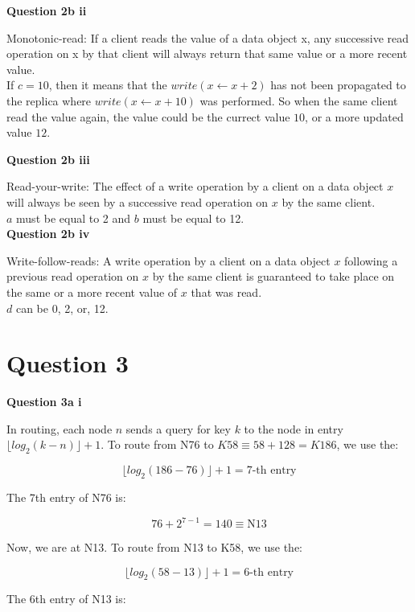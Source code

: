 \documentclass[11pt,a4paper]{report}
\begin{document}
\begin{multicols*}{2}
\noindent \textbf{Question 2b ii}

\noindent Monotonic-read: If a client reads the value of a data object x, any successive read operation on x by that client will always return that same value or a more recent value.\\

\noindent If $c=10$, then it means that the $write(x\leftarrow x + 2)$ has not been propagated to the replica where $write(x\leftarrow x + 10)$ was performed. So when the same client read the value again, the value could be the currect value $10$, or a more updated value $12$.

\noindent \textbf{Question 2b iii}

\noindent Read-your-write: The effect of a write operation by a client on a data object $x$ will always be seen by a successive read operation on $x$ by the same client.\\

\noindent $a$ must be equal to 2 and $b$ must be equal to 12.\\


\noindent \textbf{Question 2b iv}

\noindent Write-follow-reads: A write operation by a client on a data object $x$ following a previous read operation on $x$ by the same client is guaranteed to take place on the same or a more recent value of $x$ that was read.\\

\noindent $d$ can be 0, 2, or, 12.

\section{Question 3}

\noindent \textbf{Question 3a i}

\noindent In routing, each node $n$ sends a query for key $k$ to the node in entry $\lfloor log_2(k-n) \rfloor + 1$. To route from N76 to $K58 \equiv 58 + 128 = K186$, we use the:

$$\lfloor log_2(186-76) \rfloor + 1 = 7\text{-th entry}$$

\noindent The 7th entry of N76 is:

$$76 + 2^{7-1} = 140 \equiv \text{N13}$$

\noindent Now, we are at N13. To route from N13 to K58, we use the:

$$\lfloor log_2(58-13) \rfloor + 1 = 6\text{-th entry}$$

\noindent The 6th entry of N13 is:


\end{multicols*}
\end{document}
